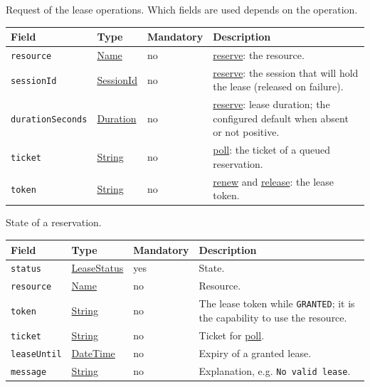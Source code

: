 \documentclass[a4paper]{arrowhead}
\newcommand{\mref}[1]{{\textcolor{ArrowheadPurple}{\hyperref[sec:model:#1]{#1}}}}
\newcommand{\oref}[1]{{\textcolor{ArrowheadBlue}{\hyperref[sec:operations:#1]{#1}}}}
\newcommand{\pref}[1]{{\textcolor{ArrowheadGrey}{\hyperref[sec:model:primitives:#1]{#1}}}}
\begin{document}
Request of the lease operations. Which fields are used depends on the operation.

{\small
\begin{longtable}{|p{3.7cm}|p{4.2cm}|p{1.6cm}|p{6.3cm}|}

\hline
\rowcolor{gray!33} Field & Type & Mandatory & Description \\ \hline
\endhead
\texttt{resource} & \pref{Name} & no & \oref{reserve}: the resource. \\ \hline
\texttt{sessionId} & \pref{SessionId} & no & \oref{reserve}: the session that will hold the lease (released on failure). \\ \hline
\texttt{duration\allowbreak{}Seconds} & \pref{Duration} & no & \oref{reserve}: lease duration; the configured default when absent or not positive. \\ \hline
\texttt{ticket} & \pref{String} & no & \oref{poll}: the ticket of a queued reservation. \\ \hline
\texttt{token} & \pref{String} & no & \oref{renew} and \oref{release}: the lease token. \\ \hline
\end{longtable}
}

State of a reservation.

{\small
\begin{longtable}{|p{3.7cm}|p{4.2cm}|p{1.6cm}|p{6.3cm}|}

\hline
\rowcolor{gray!33} Field & Type & Mandatory & Description \\ \hline
\endhead
\texttt{status} & \mref{LeaseStatus} & yes & State. \\ \hline
\texttt{resource} & \pref{Name} & no & Resource. \\ \hline
\texttt{token} & \pref{String} & no & The lease token while \texttt{GRANTED}; it is the capability to use the resource. \\ \hline
\texttt{ticket} & \pref{String} & no & Ticket for \oref{poll}. \\ \hline
\texttt{leaseUntil} & \pref{DateTime} & no & Expiry of a granted lease. \\ \hline
\texttt{message} & \pref{String} & no & Explanation, e.g. \texttt{No valid lease}. \\ \hline
\end{longtable}
}
\end{document}
